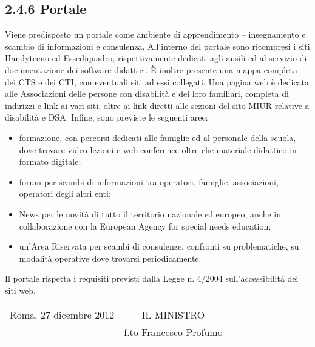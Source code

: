 \subsection*{2.4.6 Portale}
Viene predisposto un portale come ambiente di apprendimento – insegnamento e scambio di informazioni e
consulenza.
All'interno del portale sono ricompresi i siti Handytecno ed Essediquadro, rispettivamente dedicati agli ausili
ed al servizio di documentazione dei software didattici.
È inoltre presente una mappa completa dei CTS e dei CTI, con eventuali siti ad essi collegati.
Una pagina web è dedicata alle Associazioni delle persone con disabilità e dei loro familiari, completa di
indirizzi e link ai vari siti, oltre ai link diretti alle sezioni del sito MIUR relative a disabilità e DSA.
Infine, sono previste le seguenti aree:
\begin{itemize}
	\item formazione, con percorsi dedicati alle famiglie ed al personale della scuola, dove trovare video lezioni e
	web conference oltre che materiale didattico in formato digitale;
	\item forum per scambi di informazioni tra operatori, famiglie, associazioni, operatori degli altri enti;
	\item News per le novità di tutto il territorio nazionale ed europeo, anche in collaborazione con la European
	Agency for special needs education;
	\item un'Area Riservata per scambi di consulenze, confronti su problematiche, su modalità operative dove
	trovarsi periodicamente.
\end{itemize}
Il portale rispetta i requisiti previsti dalla Legge n. 4/2004 sull'accessibilità dei siti web.

\begin{tabular*}{\textwidth}%
	{@{\extracolsep{\fill}}lc}
Roma, 27 dicembre 2012&IL MINISTRO\\
	&f.to Francesco Profumo
\end{tabular*}